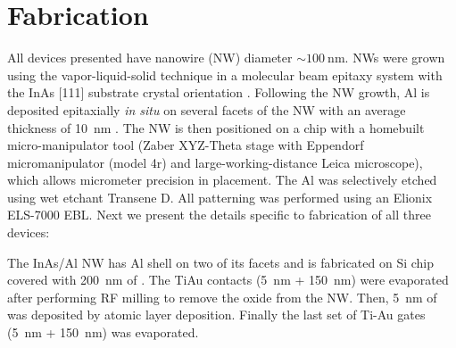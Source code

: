 \section{Fabrication}
\label{sec:majo_D}

All devices presented have nanowire (NW) diameter  $\sim \SI{100}{\nano\meter}$. NWs were grown using the vapor-liquid-solid technique in a molecular beam epitaxy system with the InAs [111] substrate crystal orientation \cite{Krogstrup}. Following the NW growth, Al is deposited epitaxially \textit{in situ} on several facets of the NW with an average thickness of \SI{10}{\nano\meter} \cite{Krogstrup,MT1}. The NW is then positioned on a chip with a homebuilt micro-manipulator tool (Zaber XYZ-Theta stage with Eppendorf micromanipulator (model 4r) and large-working-distance Leica microscope), which allows micrometer precision in placement. The Al was selectively etched using wet etchant Transene D. All patterning was performed using an Elionix ELS-7000 EBL. Next we present the details specific to fabrication of all three devices:

The InAs/Al NW has Al shell on two of its facets and is fabricated on Si chip covered with \SI{200}{\nano\meter}  of . The TiAu contacts (\SI{5}{\nano\meter} + \SI{150}{\nano\meter}) were evaporated after performing RF milling to remove the oxide from the NW. Then, \SI{5}{\nano\meter} of  was deposited by atomic layer deposition. Finally the last set of Ti-Au gates (\SI{5}{\nano\meter} + \SI{150}{\nano\meter}) was evaporated.